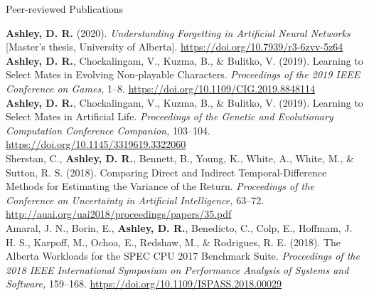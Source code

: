 \documentclass{cv}
\begin{document}
\begin{rSection}{Peer-reviewed Publications}

\textbf{Ashley, D. R.} (2020). \textit{Understanding Forgetting in Artificial Neural Networks} [Master's  thesis,  University  of  Alberta]. \url{https://doi.org/10.7939/r3-6zvv-5z64} \vspace{0.75em}\\
\textbf{Ashley, D. R.}, Chockalingam, V., Kuzma, B., \& Bulitko, V. (2019). Learning to Select Mates in Evolving Non-playable Characters. \textit{Proceedings of the 2019 IEEE Conference on Games,} 1--8. \url{https://doi.org/10.1109/CIG.2019.8848114} \vspace{0.75em}\\
\textbf{Ashley, D. R.}, Chockalingam, V., Kuzma, B., \& Bulitko, V. (2019). Learning to Select Mates in Artificial Life. \textit{Proceedings of the Genetic and Evolutionary Computation Conference Companion,} 103--104. \url{https://doi.org/10.1145/3319619.3322060} \vspace{0.75em}\\
Sherstan, C., \textbf{Ashley, D. R.}, Bennett, B., Young, K., White, A., White, M., \& Sutton, R. S. (2018). Comparing Direct and Indirect Temporal-Difference Methods for Estimating the Variance of the Return. \textit{Proceedings of the Conference on Uncertainty in Artificial Intelligence,} 63--72. \url{http://auai.org/uai2018/proceedings/papers/35.pdf} \vspace{0.75em}\\
Amaral, J. N., Borin, E., \textbf{Ashley, D. R.}, Benedicto, C., Colp, E., Hoffmam, J. H. S., Karpoff, M., Ochoa, E., Redshaw, M., \& Rodrigues, R. E. (2018). The Alberta Workloads for the SPEC CPU 2017 Benchmark Suite. \textit{Proceedings of the 2018 IEEE International Symposium on Performance Analysis of Systems and Software,} 159--168. \url{https://doi.org/10.1109/ISPASS.2018.00029}

\end{rSection}

\end{document}
